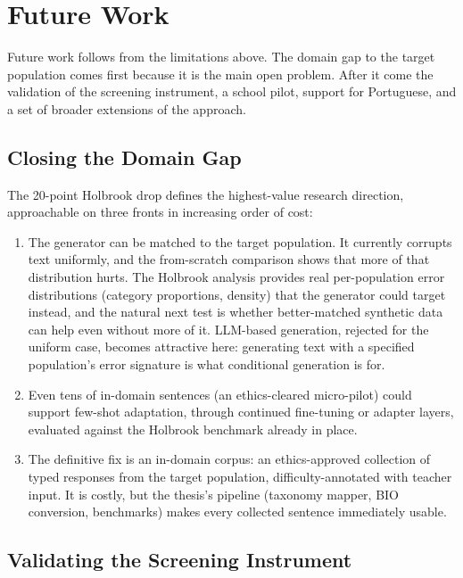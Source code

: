 \section{Future Work}
\label{sec:concl_future}

Future work follows from the limitations above. The domain gap to the target population comes first because it is the main open problem. After it come the validation of the screening instrument, a school pilot, support for Portuguese, and a set of broader extensions of the approach.

\subsection{Closing the Domain Gap}
\label{sec:concl_future_gap}

The 20-point Holbrook drop defines the highest-value research direction, approachable on three fronts in increasing order of cost:
\begin{enumerate}
    \item The generator can be matched to the target population. It currently corrupts text uniformly, and the from-scratch comparison shows that more of that distribution hurts. The Holbrook analysis provides real per-population error distributions (category proportions, density) that the generator could target instead, and the natural next test is whether better-matched synthetic data can help even without more of it. LLM-based generation, rejected for the uniform case, becomes attractive here: generating text with a specified population's error signature is what conditional generation is for.
    \item Even tens of in-domain sentences (an ethics-cleared micro-pilot) could support few-shot adaptation, through continued fine-tuning or adapter layers, evaluated against the Holbrook benchmark already in place.
    \item The definitive fix is an in-domain corpus: an ethics-approved collection of typed responses from the target population, difficulty-annotated with teacher input. It is costly, but the thesis's pipeline (taxonomy mapper, BIO conversion, benchmarks) makes every collected sentence immediately usable.
\end{enumerate}

\subsection{Validating the Screening Instrument}
\label{sec:concl_future_screening}

